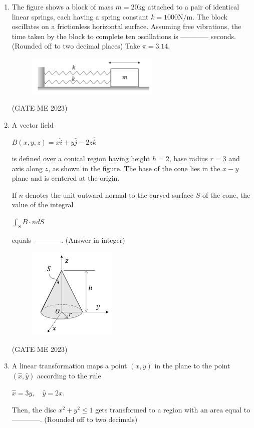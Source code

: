 \documentclass[journal]{IEEEtran}
\begin{document}
\begin{enumerate}
\item The figure shows a block of mass $ m = 20  \text{kg} $ attached to a pair of identical linear springs, each having a spring constant $ k = 1000  \text{N/m} $. The block oscillates on a frictionless horizontal surface. Assuming free vibrations, the time taken by the block to complete ten oscillations is ------------ seconds. (Rounded off to two decimal places) Take $ \pi = 3.14 $.
\begin{figure}[H]
\centering
\includegraphics[width=0.6\textwidth]{Fig 26.png}
\caption{}
\label{fig:question30}
\end{figure}
\hfill (GATE ME 2023)

\item A vector field
\begin{center}
$ B(x, y, z) = x \hat{i} + y \hat{j} - 2z \hat{k} $
\end{center}
is defined over a conical region having height $ h = 2 $, base radius $ r = 3 $ and axis along $ z $, as shown in the figure. The base of the cone lies in the $ x-y $ plane and is centered at the origin.

If $ n $ denotes the unit outward normal to the curved surface $ S $ of the cone, the value of the integral
\begin{center}
$ \int_{S} B \cdot n  dS $
\end{center}
equals ------------. (Answer in integer)
\begin{figure}[H]
\centering
\includegraphics[width=0.4\textwidth]{Fig 27.png}
\caption{}
\label{fig:question31}
\end{figure}
\hfill (GATE ME 2023)

\item A linear transformation maps a point $(x, y)$ in the plane to the point $(\hat{x}, \hat{y})$ according to the rule
\begin{center}
$ \hat{x} = 3y, \quad \hat{y} = 2x. $
\end{center}
Then, the disc $x^2 + y^2 \leq 1$ gets transformed to a region with an area equal to ------------. (Rounded off to two decimals)


\end{enumerate}
\end{document}
